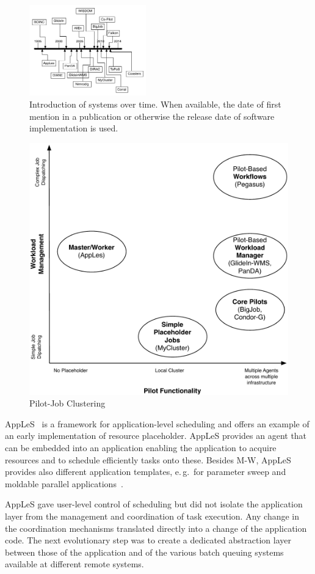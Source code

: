 \documentclass{sig-alternate}
\begin{document}
\begin{figure}[t]
  \centering
    \includegraphics[width=0.45\textwidth]{figures/timeline}
    \caption{Introduction of systems over time. When available, the date of
    first mention in a publication or otherwise the release date of software
    implementation is used.}
    \label{fig:timeline}
\end{figure}

\begin{figure}[t]
  \centering
    \includegraphics[width=.45\textwidth]{figures/pilotjob-clustering.pdf}
  \caption{Pilot-Job Clustering}
  \label{fig:pilotjob_clustering}
\end{figure}

AppLeS~\cite{Berman:1996:apples} is a framework for application-level
scheduling and offers an example of an early implementation of resource
placeholder. AppLeS provides an agent that can be embedded into an application
enabling the application to acquire resources and to schedule efficiently tasks
onto these. Besides M-W, AppLeS provides also different application templates,
e.\,g.\ for parameter sweep and moldable parallel
applications~\cite{Berman:2003:ACG:766629.766632}.

AppLeS gave user-level control of scheduling but did not isolate the
application layer from the management and coordination of task execution. Any
change in the coordination mechanisms translated directly into a change of the
application code. The next evolutionary step was to create a dedicated
abstraction layer between those of the application and of the various batch
queuing systems available at different remote systems.
\end{document}
